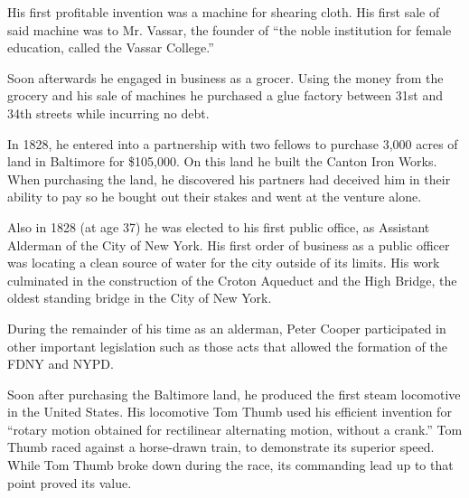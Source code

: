 \documentclass{article}
\begin{document}
\begin{minipage}[t]{0.46\linewidth}
\begin{enumList}
\item His first profitable invention was a machine for shearing cloth. His
first sale of said machine was to Mr. Vassar, the founder of ``the noble
institution for female education, called the Vassar College.''

\item Soon afterwards he engaged in business as a grocer. Using the money from
the grocery and his sale of machines he purchased a {\mdseries glue factory}
between 31st and 34th streets while {\mdseries incurring no debt}.

\setcounter{enumTemp}{\value{enumListi}}
\end{enumList}
\end{minipage}\hfill
\begin{minipage}[t]{0.46\linewidth}
\fontsize{10.7pt}{12.7pt}\selectfont
\raggedright
\upshape
\begin{enumList}
\setcounter{enumListi}{\value{enumTemp}}

\item In 1828, he entered into a partnership with two fellows to purchase 3,000
acres of land in Baltimore for \$105,000. On this land he built the {\mdseries
Canton Iron Works}. When purchasing the land, he discovered his partners had
deceived him in their ability to pay so he bought out their stakes and went at
the venture alone.

\item Also in 1828 (at age 37) he was elected to his first public office, as
{\mdseries Assistant Alderman} of the City of New York. His first order of
business as a public officer was locating a clean source of water for the city
outside of its limits. His work culminated in the construction of the
{\mdseries Croton Aqueduct} and the {\mdseries High Bridge}, the oldest
standing bridge in the City of New York.

\item During the remainder of his time as an alderman, Peter Cooper
participated in other important legislation such as those acts that {\mdseries
allowed the formation of the FDNY and NYPD}.

\item Soon after purchasing the Baltimore land, he produced the {\mdseries
first steam locomotive in the United States}. His locomotive Tom Thumb used
his efficient invention for ``rotary motion obtained for rectilinear
alternating motion, without a crank.'' Tom Thumb raced against a horse-drawn
train, to demonstrate its superior speed. While Tom Thumb broke down during
the race, its commanding lead up to that point proved its value.


\end{enumList}
\end{minipage}
\end{document}
